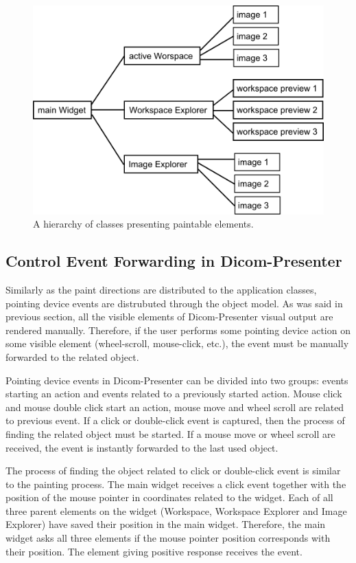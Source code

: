 \begin{figure}
	\caption{A hierarchy of classes presenting paintable elements.}
	\begin{center}
	\includegraphics[width=\textwidth]{Text/IMG/paint.png}
	\end{center}
	\label{paint}
\end{figure}

\subsection{Control Event Forwarding in Dicom-Presenter}

Similarly as the paint directions are distributed to the application classes, pointing device events are distrubuted through the object model. As was said in previous section, all the visible elements of Dicom-Presenter visual output are rendered manually. Therefore, if the user performs some pointing device action on some visible element (wheel-scroll, mouse-click, etc.), the event must be manually forwarded to the related object.

Pointing device events in Dicom-Presenter can be divided into two groups: events starting an action and events related to a previously started action. Mouse click and mouse double click start an action, mouse move and wheel scroll are related to previous event. If a click or double-click event is captured, then the process of finding the related object must be started. If a mouse move or wheel scroll are received, the event is instantly forwarded to the last used object.

The process of finding the object related to click or double-click event is similar to the painting process. The main widget receives a click event together with the position of the mouse pointer in coordinates related to the widget. Each of all three parent elements on the widget (Workspace, Workspace Explorer and Image Explorer) have saved their position in the main widget. Therefore, the main widget asks all three elements if the mouse pointer position corresponds with their position. The element giving positive response receives the event.


